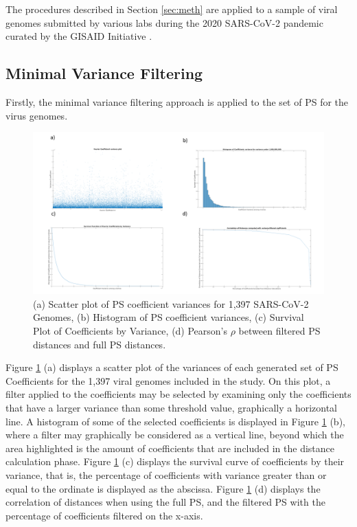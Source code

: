 \documentclass[12pt,conference]{IEEEtran}
\begin{document}
The procedures described in Section \ref{sec:meth} are applied to a sample of viral genomes
submitted by various labs during the 2020 SARS-CoV-2 pandemic curated by the GISAID Initiative \cite{gisaid}. 

\subsection{Minimal Variance Filtering} 

Firstly, the minimal variance filtering approach is applied to the set of PS for the virus genomes. 

\begin{figure}[h!] 
\caption{(a) Scatter plot of PS coefficient variances for 1,397 SARS-CoV-2 Genomes, (b) Histogram of PS coefficient variances, (c) Survival Plot of Coefficients by Variance, (d) Pearson's $\rho$ between filtered PS distances and full PS distances. \label{fig:coeffvar}} 
\centering
\includegraphics[scale=0.27]{Images/Files/VarianceFiltCombined.png}
\end{figure}


Figure \ref{fig:coeffvar} (a) displays a scatter plot of the variances of each generated set of PS Coefficients for the 1,397 viral genomes included in the study.  On this plot, a filter applied to the 
coefficients may be selected by examining only the coefficients that have a larger variance than some threshold value, graphically a horizontal line. 
A histogram of some of the selected coefficients is displayed in Figure \ref{fig:coeffvar} (b), where 
a filter may graphically be considered as a vertical line, beyond which the area
highlighted is the amount of coefficients that are included in the distance calculation phase.  
Figure \ref{fig:coeffvar} (c) displays the survival curve of coefficients by their variance, that is, the
percentage of coefficients with variance greater than or equal to the ordinate is displayed as the 
abscissa. Figure \ref{fig:coeffvar} (d) displays the correlation of distances when using the full PS, and the filtered PS with the percentage of coefficients filtered on the x-axis. 
\end{document}
